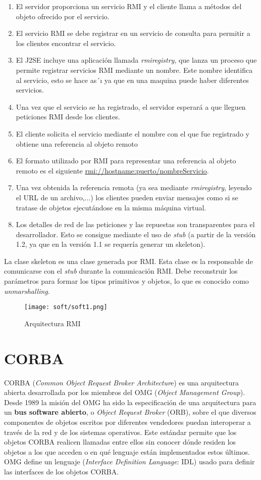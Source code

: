 \documentclass[
	12pt, %
	fleqn, %
	a4paper, %
	oneside, %
]{LegrandOrangeBook}
\begin{document}
\begin{enumerate}
\item El servidor proporciona un servicio RMI y el cliente llama a métodos del objeto ofrecido por el servicio.
\item El servicio RMI se debe registrar en un servicio de consulta para permitir a los clientes encontrar el servicio.
\item El J2SE incluye una aplicación llamada \textit{rmiregistry}, que lanza un proceso que permite registrar servicios RMI mediante un nombre. Este nombre identifica al servicio, esto se hace as´ı ya que en una maquina puede haber diferentes servicios.
\item Una vez que el servicio se ha registrado, el servidor esperará a que lleguen peticiones RMI desde
los clientes.
\item El cliente solicita el servicio mediante el nombre con el que fue registrado y obtiene una referencia al objeto remoto
\item El formato utilizado por RMI para representar una referencia al objeto remoto es el siguiente \url{rmi://hostname:puerto/nombreServicio}.
\item Una vez obtenida la referencia remota (ya sea mediante \textit{rmiregistry}, leyendo el URL de un archivo,...) los clientes pueden enviar mensajes como si se tratase de objetos ejecutándose en la misma máquina virtual.
\item Los detalles de red de las peticiones y las repuestas son transparentes para el desarrollador. Esto se consigue mediante el uso de \textit{stub} (a partir de la versión 1.2, ya que en la versión 1.1 se requería generar un skeleton).
\end{enumerate}
\begin{definition}[Skeleton]
La clase skeleton es una clase generada por RMI. Esta clase es la responsable de comunicarse con el \textit{stub} durante la comunicación RMI. Debe reconstruir los parámetros para formar los tipos primitivos y objetos, lo que es conocido como \textit{unmarshalling}.
\end{definition}
\begin{figure}[H]
\centering
\texttt{[image: soft/soft1.png]}
\caption{Arquitectura RMI}
\end{figure}
\section{CORBA}
CORBA (\textit{Common Object Request Broker Architectur}e) es una arquitectura abierta desarrollada por los miembros del OMG (\textit{Object Management Group}). Desde 1989 la misión del OMG ha sido la especificación de una arquitectura para un \textbf{bus software abierto}, o \textit{Object Request Broker} (ORB), sobre el que diversos componentes de objetos escritos por diferentes vendedores puedan interoperar a través de la red y de los sistemas operativos. Este estándar permite que los objetos CORBA realicen llamadas entre ellos sin conocer dónde residen los objetos a los que acceden o en qué lenguaje están implementados estos últimos. OMG define un lenguaje (\textit{Interface Definition Language}: IDL) usado para definir las interfaces de los objetos CORBA.
\end{document}
